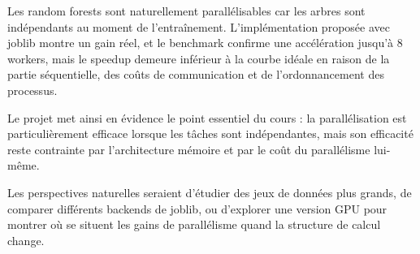 \documentclass[11pt,a4paper]{article}
\begin{document}
Les random forests sont naturellement parallélisables car les arbres sont indépendants au moment de l'entraînement. L'implémentation proposée avec joblib montre un gain réel, et le benchmark confirme une accélération jusqu'à 8 workers, mais le speedup demeure inférieur à la courbe idéale en raison de la partie séquentielle, des coûts de communication et de l'ordonnancement des processus.

Le projet met ainsi en évidence le point essentiel du cours : la parallélisation est particulièrement efficace lorsque les tâches sont indépendantes, mais son efficacité reste contrainte par l'architecture mémoire et par le coût du parallélisme lui-même.

Les perspectives naturelles seraient d'étudier des jeux de données plus grands, de comparer différents backends de joblib, ou d'explorer une version GPU pour montrer où se situent les gains de parallélisme quand la structure de calcul change.
\end{document}
